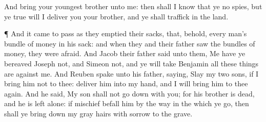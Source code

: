 {And
bring your
youngest
brother unto me: then shall I
know that ye
{} no
spies, but
{} ye
{}
true
{} will I
deliver you your
brother, and ye shall
traffick in the
land.
\par }{\PP {}¶ And it came to pass as they
emptied their
sacks, that, behold, every
man’s
bundle of
money
{} in his
sack: and when
{} they and their
father
saw the
bundles of
money, they were
afraid.
And
Jacob their
father
said unto them, Me have ye
bereaved
{}
Joseph
{} not, and
Simeon
{} not, and ye will
take
Benjamin
{} all these things are against me.
And
Reuben
spake unto his
father,
saying,
Slay my
two
sons, if I
bring him not to thee:
deliver him into my
hand, and I will bring him to thee
again.
And he
said, My
son shall not go
down with you; for his
brother is
dead, and he is
left alone: if
mischief
befall him by the
way in the which ye
go, then shall ye bring
down my gray
hairs with
sorrow to the
grave.

}
